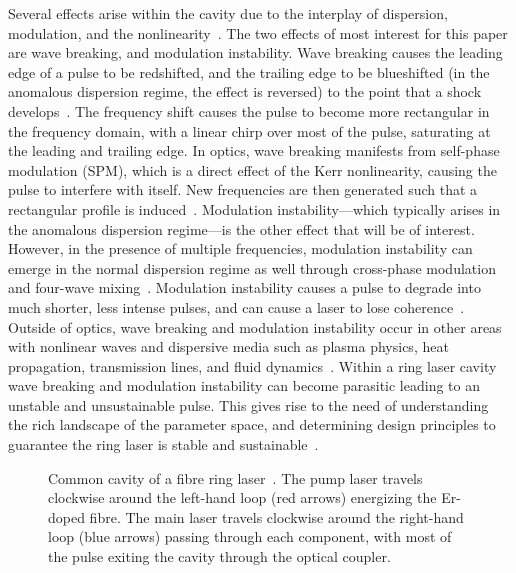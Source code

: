 \documentclass[9pt,twocolumn,twoside]{osajnl}
\begin{document}
Several effects arise within the cavity due to the interplay of dispersion, modulation, and the nonlinearity~\cite{bohun2015, coen1997, lapre2019, meng2020, oktem2010, shao2019, woodward2018}. The two effects of most interest for this paper are wave breaking, and modulation instability. Wave breaking causes the leading edge of a pulse to be redshifted, and the trailing edge to be blueshifted (in the anomalous dispersion regime, the effect is reversed) to the point that a shock develops~\cite{anderson1992, rothenberg1989a, rothenberg1989b, tomlinson1984, tomlinson1985}. The frequency shift causes the pulse to become more rectangular in the frequency domain, with a linear chirp over most of the pulse, saturating at the leading and trailing edge. In optics, wave breaking manifests from self-phase modulation (SPM), which is a direct effect of the Kerr nonlinearity, causing the pulse to interfere with itself. New frequencies are then generated such that a rectangular profile is induced~\cite{agrawal2013, woodward2018}. Modulation instability---which typically arises in the anomalous dispersion regime---is the other effect that will be of interest. However, in the presence of multiple frequencies, modulation instability can emerge in the normal dispersion regime as well through cross-phase modulation and four-wave mixing~\cite{agrawal1987, agrawal2013, haelterman1992}. Modulation instability causes a pulse to degrade into much shorter, less intense pulses, and can cause a laser to lose coherence~\cite{agrawal1987, coen1997, haelterman1992}. Outside of optics, wave breaking and modulation instability occur in other areas with nonlinear waves and dispersive media such as plasma physics, heat propagation, transmission lines, and fluid dynamics~\cite{coen1997, rothenberg1989b}. Within a ring laser cavity wave breaking and modulation instability can become parasitic leading to an unstable and unsustainable pulse. This gives rise to the need of understanding the rich landscape of the parameter space, and determining design principles to guarantee the ring laser is stable and sustainable~\cite{bohun2015, burgoyneemail, finot2008, lapre2019, woodward2018}.

\begin{figure}[tbp]
	\centering
	
	\caption{Common cavity of a fibre ring laser~\cite{burgoyne2014, chung2017, lapre2019, shao2019}. The pump laser travels clockwise around the left-hand loop (red arrows) energizing the Er-doped fibre. The main laser travels clockwise around the right-hand loop (blue arrows) passing through each component, with most of the pulse exiting the cavity through the optical coupler.}
	\label{fig:cavity}
\end{figure}
\end{document}
